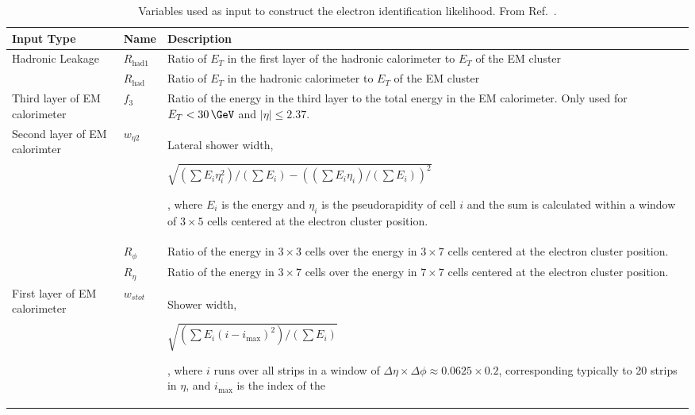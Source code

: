 \begin{table}[!htb]
    \caption{
        Variables used as input to construct the electron identification likelihood.
        From Ref.~\cite{Aad:2019tso}.
    }
    \label{tab:egamma_lh_inputs}
    \begin{scriptsize}
    \begin{center}
    \begin{tabularx}{\textwidth}{|X|l|X|}
    \hline
    \hline
    \textbf{Input Type} & \textbf{Name} & \textbf{Description} \\
    \hline
    \multirow{2}{*}{Hadronic Leakage} & $R_{\text{had1}}$ & Ratio of $E_T$ in the first layer of the hadronic calorimeter to $E_T$ of the EM cluster \\
    \cline{2-3}
                & $R_{\text{had}}$ & Ratio of $E_T$ in the hadronic calorimeter to $E_T$ of the EM cluster \\
    \hline
    \multirow{1}{*}{Third layer of EM calorimeter} & $f_3$ & Ratio of the energy in the third layer to the total energy in the
            EM calorimeter. Only used for $E_T<30\,\GeV$  and $\lvert \eta \rvert \le 2.37$. \\
    \hline
    \multirow{3}{*}{Second layer of EM calorimter} & $w_{\eta 2}$ & Lateral shower width,
            \begin{small}$\sqrt{(\sum E_i \eta_i^2) / (\sum E_i) - ((\sum E_i \eta_i) / (\sum E_i))^2}$\end{small},
            where $E_i$ is the energy and $\eta_i$ is the pseudorapidity of cell $i$ and the sum
            is calculated within a window of $3\times5$ cells centered at the electron cluster position. \\ \cline{2-3}
            & $R_{\phi}$ & Ratio of the energy in $3\times 3$ cells over the energy in $3\times7$ cells
            centered at the electron cluster position. \\ \cline{2-3}
            & $R_{\eta}$ & Ratio of the energy in $3\times 7$ cells over the energy in $7\times7$ cells
            centered at the electron cluster position. \\ \cline{2-3}
    \hline
    \multirow{3}{*}{First layer of EM calorimeter} & $w_{stot}$ & Shower width,
            \begin{small} $\sqrt{ (\sum E_i(i - i_{\text{max}})^2)/(\sum E_i)}$ \end{small}, where $i$ runs
            over all strips in a window of $\Delta \eta \times \Delta \phi \approx 0.0625 \times 0.2$,
            corresponding typically to 20 strips in $\eta$, and $i_{\text{max}}$ is the index of the

\end{tabularx}
\end{center}
\end{scriptsize}
\end{table}
